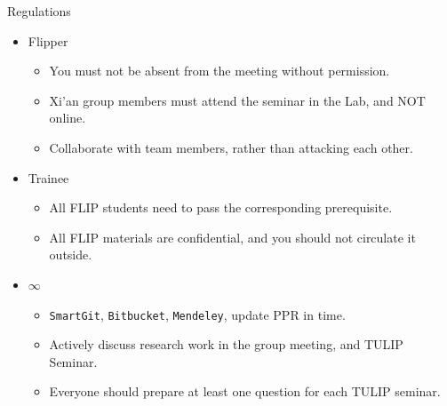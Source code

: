 \documentclass[
 size=14pt,
 paper=smartboard,  %
 mode=present, 		%
 display=slides, 	%
 style=tuliplab,  	%
 pauseslide,
 fleqn,leqno]{powerdot}{}
\begin{document}
\begin{slide}{Regulations}

\begin{center}
\begin{itemize}

\item<1->
{Flipper}

\begin{itemize}
\item
You must not be absent from the meeting without permission.

\item
Xi'an group members must attend the seminar in the Lab,
and NOT online.

\item
Collaborate with team members, rather than attacking each other.
\end{itemize}

\item<2->
{Trainee}

\begin{itemize}
\item
All FLIP students need to pass the corresponding prerequisite.

\item
All FLIP materials are confidential, and you should not circulate it outside.
\end{itemize}

\item<3->
{$\infty$}

\begin{itemize}
\item
\texttt{SmartGit}, \texttt{Bitbucket}, \texttt{Mendeley},
update PPR in time.

\item
Actively discuss research work in the group meeting, and TULIP Seminar.

\item
Everyone should prepare at least one question for each TULIP seminar.
\end{itemize}
\end{itemize}
\end{center}

\end{slide}
\end{document}
